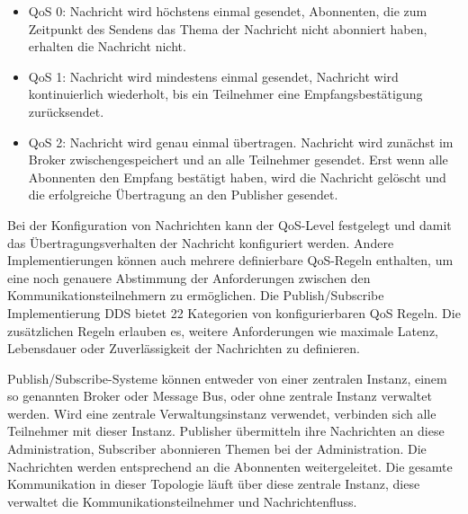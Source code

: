 \begin{itemize}
    \item \gls{QoS} 0: Nachricht wird höchstens einmal gesendet, Abonnenten, die zum Zeitpunkt des Sendens das Thema der Nachricht nicht abonniert haben, erhalten die Nachricht nicht.
    \item \gls{QoS} 1: Nachricht wird mindestens einmal gesendet, Nachricht wird kontinuierlich wiederholt, bis ein Teilnehmer eine Empfangsbestätigung zurücksendet.
    \item \gls{QoS} 2: Nachricht wird genau einmal übertragen. Nachricht wird zunächst im Broker zwischengespeichert und an alle Teilnehmer gesendet. Erst wenn alle Abonnenten den Empfang bestätigt haben, wird die Nachricht gelöscht und die erfolgreiche Übertragung an den Publisher gesendet. 
\end{itemize}

Bei der Konfiguration von Nachrichten kann der \gls{QoS}-Level festgelegt und damit das Übertragungsverhalten der Nachricht konfiguriert werden. Andere Implementierungen können auch mehrere definierbare \gls{QoS}-Regeln enthalten, um eine noch genauere Abstimmung der Anforderungen zwischen den Kommunikationsteilnehmern zu ermöglichen. Die Publish/Subscribe Implementierung \gls{DDS} bietet 22 Kategorien von konfigurierbaren \gls{QoS} Regeln. Die zusätzlichen Regeln erlauben es, weitere Anforderungen wie maximale Latenz, Lebensdauer oder Zuverlässigkeit der Nachrichten zu definieren. 

Publish/Subscribe-Systeme können entweder von einer zentralen Instanz, einem so genannten Broker oder Message Bus, oder ohne zentrale Instanz verwaltet werden. Wird eine zentrale Verwaltungsinstanz verwendet, verbinden sich alle Teilnehmer mit dieser Instanz. Publisher übermitteln ihre Nachrichten an diese Administration, Subscriber abonnieren Themen bei der Administration. Die Nachrichten werden entsprechend an die Abonnenten weitergeleitet. Die gesamte Kommunikation in dieser Topologie läuft über diese zentrale Instanz, diese verwaltet die Kommunikationsteilnehmer und Nachrichtenfluss.


